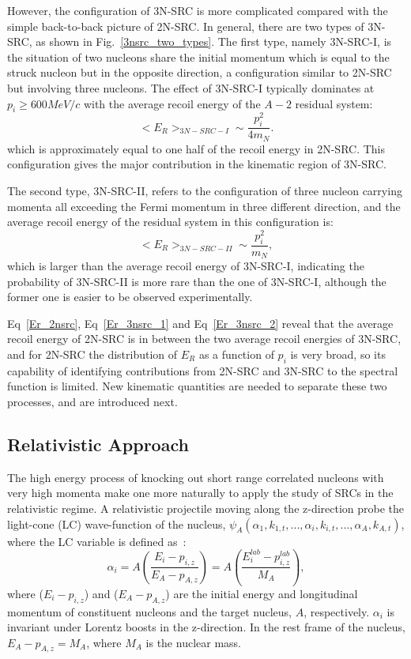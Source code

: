 However, the configuration of 3N-SRC is more complicated compared with the simple back-to-back picture of 2N-SRC. In general, there are two types of 3N-SRC, as shown in Fig.~\ref{3nsrc_two_types}. The first type, namely 3N-SRC-I, is the situation of two nucleons share the initial momentum which is equal to the struck nucleon but in the opposite direction, a configuration similar to 2N-SRC but involving three nucleons. The effect of 3N-SRC-I typically dominates at $p_{i}\geq 600 MeV/c$ with the average recoil energy of the $A-2$ residual system:
\begin{equation}
  <E_{R}>_{3N-SRC-I} \sim \frac{p^{2}_{i}}{4m_{N}}.
  \label{Er_3nsrc_1}
\end{equation}
which is approximately equal to one half of the recoil energy in 2N-SRC. This configuration gives the major contribution in the kinematic region of 3N-SRC.

The second type, 3N-SRC-II, refers to the configuration of three nucleon carrying momenta all exceeding the Fermi momentum in three different direction, and the average recoil energy of the residual system in this configuration is:
\begin{equation}
  <E_{R}>_{3N-SRC-II} \sim \frac{p^{2}_{i}}{m_{N}},
  \label{Er_3nsrc_2}
\end{equation}
which is larger than the average recoil energy of 3N-SRC-I, indicating the probability of 3N-SRC-II is more rare than the one of 3N-SRC-I, although the former one is easier to be observed experimentally. 

Eq~\eqref{Er_2nsrc}, Eq~\eqref{Er_3nsrc_1} and Eq~\eqref{Er_3nsrc_2} reveal that the average recoil energy of 2N-SRC is in between the two average recoil energies of 3N-SRC, and for 2N-SRC the distribution of $E_{R}$ as a function of $p_{i}$ is very broad, so its capability of identifying contributions from 2N-SRC and 3N-SRC to the spectral function is limited. New kinematic quantities are needed to separate these two processes, and are introduced next.

\subsection{Relativistic Approach}
The high energy process of knocking out short range correlated nucleons with very high momenta make one more naturally to apply the study of SRCs in the relativistic regime. A relativistic projectile moving along the z-direction probe the light-cone (LC) wave-function of the nucleus, $\psi_{A}(\alpha_{1},k_{1,t},...,\alpha_{i},k_{i,t},...,\alpha_{A},k_{A,t})$, where the LC variable is defined as~\cite{Frankfurt_misak}:
\begin{equation}
  \alpha_{i} = A\left(\frac{E_{i}-p_{i,z}}{E_{A}-p_{A,z}}\right)=A\left(\frac{E_{i}^{lab}-p_{i,z}^{lab}}{M_{A}}\right),
\end{equation}  
where ($E_{i}-p_{i,z}$) and ($E_{A}-p_{A,z}$) are the initial energy and longitudinal momentum of constituent nucleons and the target nucleus, $A$, respectively. $\alpha_{i}$ is invariant under Lorentz boosts in the z-direction. In the rest frame of the nucleus, $E_{A}-p_{A,z}=M_{A}$, where $M_{A}$ is the nuclear mass. 

